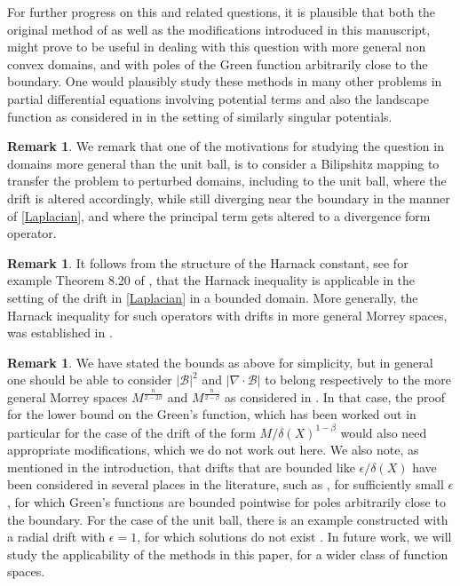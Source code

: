 \documentclass{article}
\newcounter{rmk}
\newcounter{lem}
\theoremstyle{plain}
\theoremstyle{definition}
\newtheorem{remark}[rmk]{Remark}
\theoremstyle{plain}
\newcommand{\eps}{\epsilon}
\newcommand{\B}{\mathcal{B}}
\begin{document}
For further progress on this and related questions, it is plausible that both the original method of \cite{Pat25} as well as the modifications introduced in this manuscript, might prove to be useful in dealing with this question with more general non convex domains, and with poles of the Green function arbitrarily close to the boundary. One would plausibly study these methods in many other problems in partial differential equations involving potential terms and also the landscape function as considered in \cite{DGM23, Pog24} in the setting of similarly singular potentials.

\begin{remark}
    We remark that one of the motivations for studying the question in domains more general than the unit ball, is to consider a Bilipshitz mapping to transfer the problem to perturbed domains, including to the unit ball, where the drift is altered accordingly, while still diverging near the boundary in the manner of \cref{Laplacian}, and where the principal term gets altered to a divergence form operator. 
\end{remark}

\begin{remark}
    It follows from the structure of the Harnack constant, see for example Theorem 8.20 of \cite{Gt}, that the Harnack inequality is applicable in the setting of the drift in \cref{Laplacian} in a bounded domain. More generally, the Harnack inequality for such operators with drifts in more general Morrey spaces, was established in \cite{Naz12}.
\end{remark}

\begin{remark}
    We have stated the bounds as above for simplicity, but in general one should be able to consider $|\B|^2$ and $|\nabla\cdot \B|$ to belong respectively to the more general Morrey spaces $M^{\frac{n}{2-2\beta}}$ and $M^{\frac{n}{2-\beta}}$ as considered in \cite{Ha24}. In that case, the proof for the lower bound on the Green's function, which has been worked out in particular for the case of the drift of the form $M/\delta(X)^{1-\beta}$ would also need appropriate modifications, which we do not work out here.  We also note, as mentioned in the introduction, that drifts that are bounded like $\eps/\delta(X)$ have been considered in several places in the literature, such as \cite{An86, Singdr}, for sufficiently small $\eps$, for which Green's functions are bounded pointwise for poles arbitrarily close to the boundary. For the case of the unit ball, there is an example constructed with a radial drift with $\eps=1$, for which solutions do not exist \cite{Pat24}. In future work, we will study the applicability of the methods in this paper, for a wider class of function spaces.

\end{remark}
\end{document}
